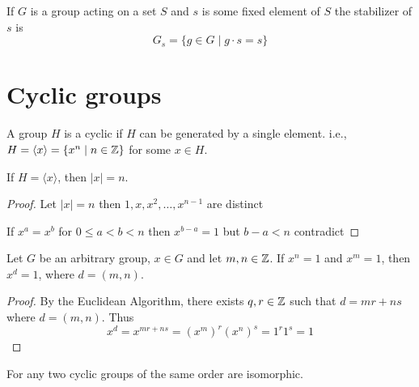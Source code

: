 \begin{definition}[Stabilizer]
  If $G$ is a group acting on a set $S$ and $s$ is some fixed element of $S$ 
  the stabilizer of $s$ is 
  $$G_s = \{g \in G \mid g\cdot s = s\}$$
\end{definition}

\section{Cyclic groups}

\begin{definition}
  A group $H$ is a cyclic if $H$ can be generated by a single element. i.e., $H = \langle x \rangle = \{x^n \mid n \in \mathbb Z\}$ for some $x \in H$.
\end{definition}

\begin{proposition}
  If $H = \langle x \rangle$, then $|x| = n$.
\end{proposition}

\begin{proof}
  Let $|x| = n$ then $1, x, x^2, \dotsc, x^{n-1}$ are distinct


  If $x^a = x^b$ for $0\le a < b < n$ then $x^{b-a} = 1$ but $b-a < n$ contradict
\end{proof}

\begin{proposition}\label{thm:gcdcyc}
  Let $G$ be an arbitrary group, $x \in G$ and let $m, n \in \mathbb Z$. If $x^n = 1$ and
$x^m = 1$, then $x^d = 1$, where $d = (m, n)$.  
\end{proposition}

\begin{proof}
  By the Euclidean Algorithm, there exists $q, r \in \mathbb Z$ such that $d = mr + ns$ where $d = (m, n)$. Thus
  $$x^d = x^{mr+ns} = (x^{m})^r(x^n)^s = 1^r1^s=1$$
\end{proof}

\begin{theorem}
  For any two cyclic groups of the same order are isomorphic.
\end{theorem}

